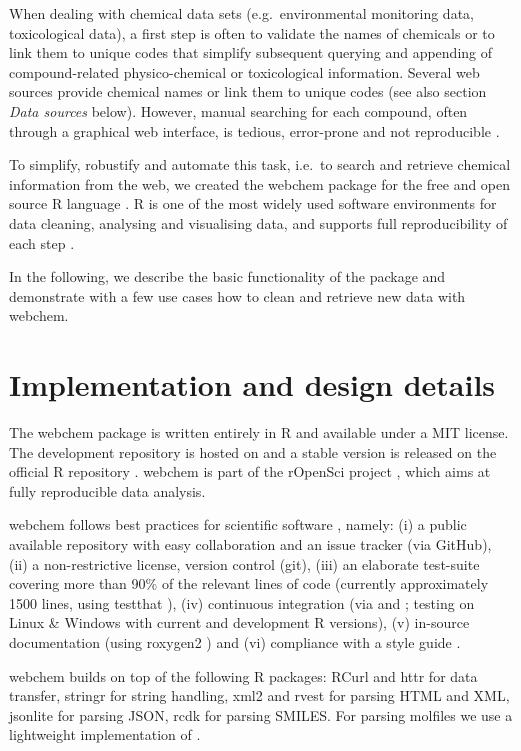 When dealing with chemical data sets (e.g.\ environmental monitoring data, toxicological data), a first step is often to validate the names of chemicals or to link them to unique codes that simplify subsequent querying and appending of compound-related physico-chemical or toxicological information.
Several web sources provide chemical names or link them to unique codes (see also section \emph{Data sources} below).
However, manual searching for each compound, often through a graphical web interface, is tedious, error-prone and not reproducible \citep{Peng_2009}.

To simplify, robustify and automate this task, i.e.\ to search and retrieve chemical information from the web, we created the webchem package for the free and open source R language \citep{r_2015, Wehrens_2011}.
R is one of the most widely used software environments for data cleaning, analysing and visualising data, and supports full reproducibility of each step \citep{Marwick_2016}.

In the following, we describe the basic functionality of the package and demonstrate with a few use cases how to clean and retrieve new data with webchem.


\section[Implementation and design details]{Implementation and design details}
The webchem package is written entirely in R and available under a MIT license.
The development repository is hosted on \citet{github} and a stable version is released on the official R repository \citep{cran}.
webchem is part of the rOpenSci project \citep{boettiger2015building}, which aims at fully reproducible data analysis.

webchem follows best practices for scientific software \citep{wilson_best_2014, poisot_best_2015}, namely: (i) a public available repository with easy collaboration and an issue tracker (via GitHub), (ii) a non-restrictive license, version control (git), (iii) an elaborate test-suite covering more than 90\% of the relevant lines of code (currently approximately 1500 lines, using testthat \citep{wickham_testthat:_2011}), (iv) continuous integration (via \citet{travis-ci} and \citet{appveyor}; testing on Linux \& Windows with current and development R versions), (v) in-source documentation (using roxygen2 \citep{wickham_roxygen2:_2015}) and (vi) compliance with a style guide \citep{wickham_advanced_2015}.

webchem builds on top of the following R packages:
RCurl \citep{lang_rcurl:_2015} and httr \citep{wickham_httr} for data transfer,
stringr \citep{wickham_stringr:_2015} for string handling,
xml2 \citep{wickham_xml2} and rvest \citep{wickham_rvest} for parsing HTML and XML,
jsonlite \citep{ooms_jsonlite_2014} for parsing JSON,
rcdk \citep{guha_rcdk} for parsing SMILES.
For parsing molfiles we use a lightweight implementation of \citep{Grabner_Varmuza_Dehmer_2012}.

